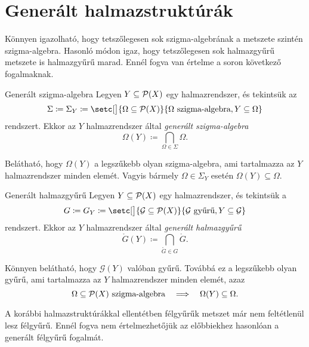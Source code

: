 \documentclass[
]{elteikthesis}[2024/04/26]
\begin{document}
	\section{Generált halmazstruktúrák}
	
	Könnyen igazolható, hogy tetszőlegesen sok szigma-algebrának a metszete szintén szigma-algebra.
	Hasonló módon igaz, hogy tetszőlegesen sok halmazgyűrű metszete is halmazgyűrű marad.
	Ennél fogva van értelme a soron következő fogalmaknak.
	
	\begin{definition}{Generált szigma-algebra}{}
		Legyen \( Y \subseteq \mathcal{P}( X ) \) egy halmazrendszer, és tekintsük az
		\[
		\Sigma \coloneq \Sigma_Y \coloneq 
		\setc[\big]{ \Omega \subseteq \powerset{X} }
		{ \Omega \text{ szigma-algebra}, Y \subseteq \Omega }
		\]
		rendszert. Ekkor az \( Y \) halmazrendszer által \emph{generált szigma-algebra}
		\[
		\Omega(Y) \coloneq \bigcap_{\Omega \in \Sigma} \Omega.
		\]
	\end{definition}
	
	\noindent 
	Belátható, hogy \( \Omega(Y) \) a legszűkebb olyan szigma-algebra,
	ami tartalmazza az \( Y \) halmazrendszer minden elemét.
	Vagyis bármely \( \Omega \in \Sigma_Y \) esetén \( \Omega(Y) \subseteq \Omega \).
	
	\begin{definition}{Generált halmazgyűrű}{}
		Legyen \( Y \subseteq \mathcal{P}( X ) \) egy halmazrendszer, és tekintsük a
		\[
			G \coloneq G_Y \coloneq 
			\setc[\big]{ \ring{G} \subseteq \powerset{X} }
			{ \ring{G} \text{ gyűrű}, Y \subseteq \ring{G} }
		\]
		rendszert. Ekkor az \( Y \) halmazrendszer által \emph{generált halmazgyűrű}
		\[
			\ring{G}(Y) \coloneq \bigcap_{\ring{G} \in G} \ring{G}.
		\]
	\end{definition}
	
	\noindent 
	Könnyen belátható, hogy \( \mathcal{G}(Y) \) valóban gyűrű. 
	Továbbá ez a legszűkebb olyan gyűrű, ami tartalmazza az \( Y \) halmazrendszer minden elemét, azaz
	\[
		\Omega \subseteq \mathcal{P}( X ) \text{ szigma-algebra}
		\quad \Longrightarrow \quad
		\Omega(Y) \subseteq \Omega.
	\]
	
	\noindent
	A korábbi halmazstruktúrákkal ellentétben félgyűrűk metszet már nem feltétlenül lesz félgyűrű.
	Ennél fogva nem értelmezhetőjük az előbbiekhez hasonlóan a generált félgyűrű fogalmát.
	
\end{document}
